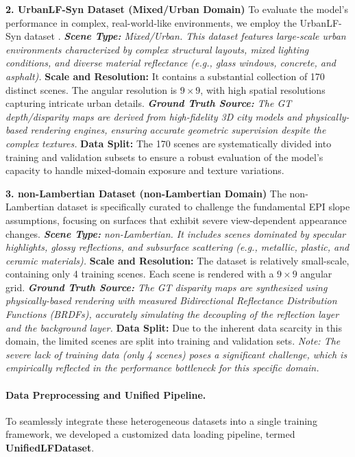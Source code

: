 \textbf{2. UrbanLF-Syn Dataset (Mixed/Urban Domain)}
To evaluate the model's performance in complex, real-world-like environments, we employ the UrbanLF-Syn dataset .
\textit{   \textbf{Scene Type:} Mixed/Urban. This dataset features large-scale urban environments characterized by complex structural layouts, mixed lighting conditions, and diverse material reflectance (e.g., glass windows, concrete, and asphalt).
}   \textbf{Scale and Resolution:} It contains a substantial collection of 170 distinct scenes. The angular resolution is $9 \times 9$, with high spatial resolutions capturing intricate urban details.
\textit{   \textbf{Ground Truth Source:} The GT depth/disparity maps are derived from high-fidelity 3D city models and physically-based rendering engines, ensuring accurate geometric supervision despite the complex textures.
}   \textbf{Data Split:} The 170 scenes are systematically divided into training and validation subsets to ensure a robust evaluation of the model's capacity to handle mixed-domain exposure and texture variations.

\textbf{3. non-Lambertian Dataset (non-Lambertian Domain)}
The non-Lambertian dataset  is specifically curated to challenge the fundamental EPI slope assumptions, focusing on surfaces that exhibit severe view-dependent appearance changes.
\textit{   \textbf{Scene Type:} non-Lambertian. It includes scenes dominated by specular highlights, glossy reflections, and subsurface scattering (e.g., metallic, plastic, and ceramic materials).
}   \textbf{Scale and Resolution:} The dataset is relatively small-scale, containing only 4 training scenes. Each scene is rendered with a $9 \times 9$ angular grid. 
\textit{   \textbf{Ground Truth Source:} The GT disparity maps are synthesized using physically-based rendering with measured Bidirectional Reflectance Distribution Functions (BRDFs), accurately simulating the decoupling of the reflection layer and the background layer.
}   \textbf{Data Split:} Due to the inherent data scarcity in this domain, the limited scenes are split into training and validation sets. \textit{Note: The severe lack of training data (only 4 scenes) poses a significant challenge, which is empirically reflected in the performance bottleneck for this specific domain.}

\paragraph{Data Preprocessing and Unified Pipeline.}

To seamlessly integrate these heterogeneous datasets into a single training framework, we developed a customized data loading pipeline, termed \textbf{UnifiedLFDataset}. 


